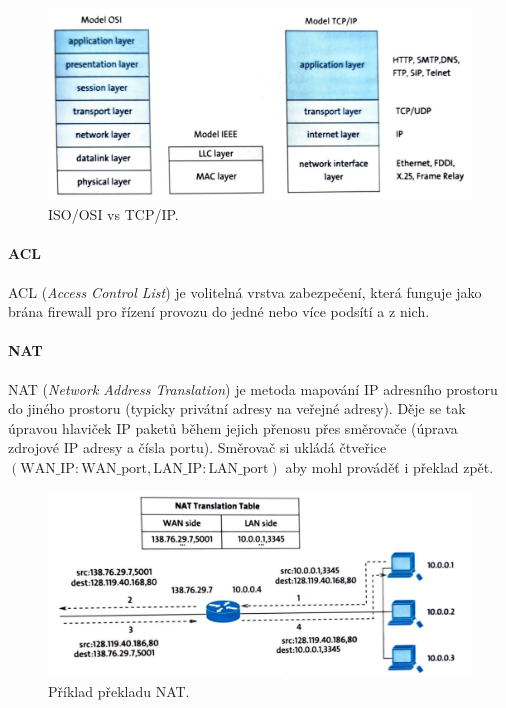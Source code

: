 \begin{figure}[H]
    \centering
    \includegraphics[width=1\linewidth]{isoosi_tcpip.pdf}
    \caption{ISO/OSI vs TCP/IP.}
\end{figure}

\paragraph*{ACL} ACL (\textit{Access Control List}) je volitelná vrstva zabezpečení, která funguje jako brána firewall pro řízení provozu do jedné nebo více podsítí a z nich.

\paragraph*{NAT} NAT (\textit{Network Address Translation}) je metoda mapování IP adresního prostoru do jiného prostoru (typicky privátní adresy na veřejné adresy). Děje se tak úpravou hlaviček IP paketů během jejich přenosu přes směrovače (úprava zdrojové IP adresy a čísla portu). Směrovač si ukládá čtveřice $(\text{WAN\_IP}:\text{WAN\_port}, \text{LAN\_IP}:\text{LAN\_port})$ aby mohl prováděť i překlad zpět.

\begin{figure}[H]
    \centering
    \includegraphics[width=1\linewidth]{nat.pdf}
    \caption{Příklad překladu NAT.}
\end{figure}

